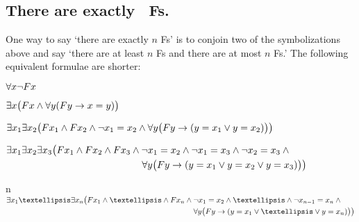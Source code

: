 \subsection*{There are exactly \blank\ Fs.}
\label{summary.exactly}

One way to say `there are exactly $n$ Fs' is to conjoin two of the symbolizations above and say `there are at least $n$ Fs and there are at most $n$ Fs.' The following equivalent formulae are shorter:
\begin{ekey}
\item[\text{zero}] $\forall x\neg Fx$
\item[\text{one}] $\exists x\bigl(Fx \wedge \forall y(Fy \rightarrow x= y) \bigr)$
\item[\text{two}] $\exists x_1\exists x_2\bigl(Fx_1 \wedge Fx_2 \wedge \neg x_1 = x_2 \wedge \forall y\bigl(Fy \rightarrow (y= x_1 \vee y = x_2) \bigr) \bigr)$
\item[\text{three}] $\begin{multlined}[t]
	\exists x_1\exists x_2\exists x_3\bigl( Fx_1 \eand Fx_2 \eand Fx_3 \eand \enot x_1 =  x_2 \eand \enot  x_1 = x_3 \eand \enot x_2 = x_3 \eand \phantom{x} \\
\forall y\bigl( Fy \eif (y = x_1 \eor y = x_2 \eor y =  x_3) \bigr) \bigr)
\end{multlined}$
\item[n] $\begin{multlined}[t]
	\exists x_1…\exists x_n\bigl( Fx_1 \eand …\eand Fx_n  \eand \enot x_1 = x_2 \eand …\eand \enot x_{n-1}= x_n \eand \phantom{x} \\
\forall y\bigl( Fy \eif (y= x_1 \eor … \eor y= x_n) \bigr)\bigr)
\end{multlined}$ 
\end{ekey}

\newpage
\label{ProofRules}
